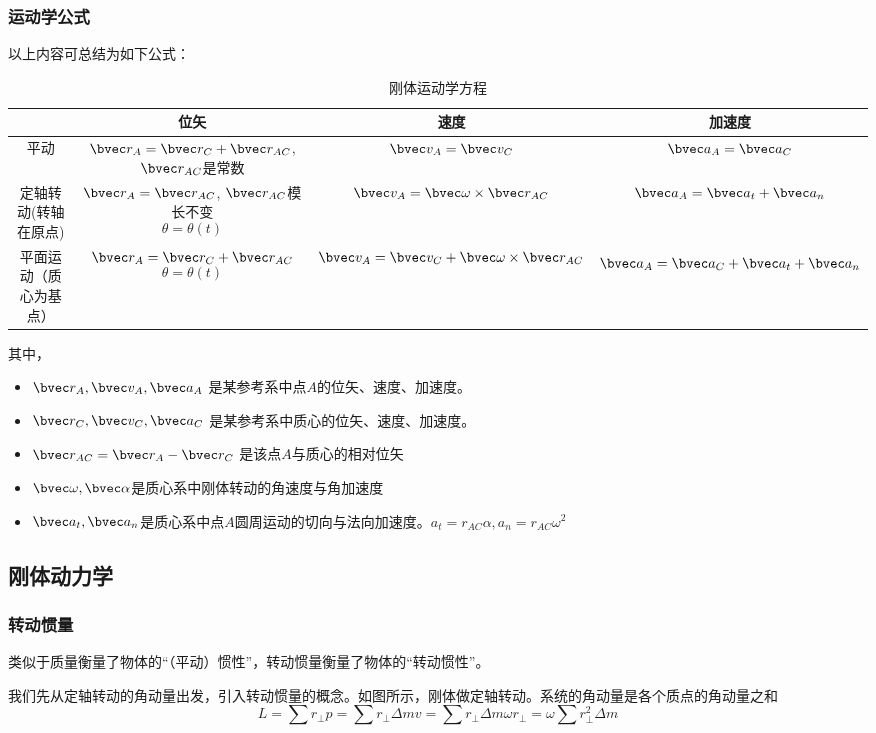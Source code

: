 \subsubsection{运动学公式}
以上内容可总结为如下公式：
\begin{table}[ht]
\centering
\caption{刚体运动学方程}\label{RGAB_tab2}
\begin{tabular}{|c|c|c|c|}
\hline
 & 位矢 & 速度  & 加速度 \\
\hline
平动 & $\bvec r_A = \bvec r_C + \bvec r_{AC}$, $\bvec r_{AC}$是常数 & $\bvec v_A = \bvec v_C$ & $\bvec a_A = \bvec a_C$ \\
\hline
定轴转动(转轴在原点) & $\bvec r_A = \bvec r_{AC}$, $\bvec r_{AC}$模长不变 $$\theta =\theta (t) $$ & $\bvec v_A = \bvec \omega \times \bvec r_{AC}$ & $\bvec a_A = \bvec a_t + \bvec a_n$\\
\hline
平面运动（质心为基点） & $\bvec r_A = \bvec r_C + \bvec r_{AC}$ $$\theta =\theta (t) $$& $\bvec v_A = \bvec v_C + \bvec \omega \times \bvec r_{AC}$ & $$\bvec a_A = \bvec a_C + \bvec a_t + \bvec a_n$$ \\
\hline
\end{tabular}
\end{table}
其中，
\begin{itemize}
\item $\bvec r_A, \bvec v_A, \bvec a_A$ 是某参考系中点$A$的位矢、速度、加速度。
\item $\bvec r_C, \bvec v_C, \bvec a_C$ 是某参考系中质心的位矢、速度、加速度。
\item $\bvec r_{AC} = \bvec r_A -\bvec r_C $ 是该点$A$与质心的相对位矢
\item $\bvec \omega, \bvec \alpha$是质心系中刚体转动的角速度与角加速度
\item $\bvec a_t, \bvec a_n$是质心系中点$A$圆周运动的切向与法向加速度。$a_t=r_{AC}\alpha, a_n=r_{AC}\omega^2$
\end{itemize}

\subsection{刚体动力学}
\subsubsection{转动惯量}
类似于质量衡量了物体的“（平动）惯性”，转动惯量衡量了物体的“转动惯性”。

我们先从定轴转动的角动量出发，引入转动惯量的概念。如图所示，刚体做定轴转动。系统的角动量是各个质点的角动量之和
$$L = \sum r_\perp p = \sum r_\perp \Delta m v = \sum r_\perp \Delta m \omega r_\perp = \omega \sum r_\perp^2 \Delta m$$

